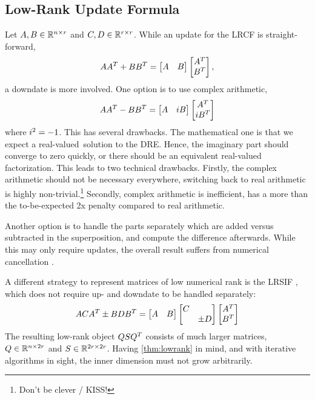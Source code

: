 \subsection{Low-Rank Update Formula}

Let $A, B \in\mathbb{R}^{n\times r}$ and $C, D\in\mathbb{R}^{r\times r}$.
While an update for the \ac{LRCF} is straight-forward,
\begin{equation}
  AA^T + BB^T =
  \begin{bmatrix}
    A & B
  \end{bmatrix}
  \begin{bmatrix}
    A^T \\ B^T
  \end{bmatrix}
  ,
\end{equation}
a downdate is more involved.
One option is to use complex arithmetic, \ie
\begin{equation}
  AA^T - BB^T =
  \begin{bmatrix}
    A & i B
  \end{bmatrix}
  \begin{bmatrix}
    A^T \\ i B^T
  \end{bmatrix}
\end{equation}
where $i^2=-1$.
This has several drawbacks.
The mathematical one is that we expect a real-valued\ solution to the \ac{DRE}.
Hence, the imaginary part should converge to zero quickly,
or there should be an equivalent real-valued factorization.
This leads to two technical drawbacks.
Firstly, the complex arithmetic should not be necessary everywhere,
switching back to real arithmetic is highly non-trivial.\footnote{Don't be clever / KISS!}
Secondly, complex arithmetic is inefficient, \ie has a more than the to-be-expected 2x penalty compared to real arithmetic.

Another option is to handle the parts separately which are added versus subtracted in the superposition,
and compute the difference afterwards.
While this may only require updates,
the overall result suffers from numerical cancellation
\cite[50]{Lang2015}
\cite[\pno~186, thesis~10]{Lang2017}.

A different strategy to represent matrices of low numerical rank is the \ac{LRSIF} \cite{Benner2009,Lang2015},
which does not require up- and downdate to be handled separately:
\begin{equation}
  ACA^T \pm BDB^T =
  \begin{bmatrix}
    A & B
  \end{bmatrix}
  \begin{bmatrix}
    C \\ & \pm D
  \end{bmatrix}
  \begin{bmatrix}
    A^T \\ B^T
  \end{bmatrix}
\end{equation}
The resulting low-rank object $QSQ^T$ consists of much larger matrices,
$Q \in\mathbb{R}^{n\times 2r}$ and $S\in\mathbb{R}^{2r\times 2r}$.
Having \autoref{thm:lowrank} in mind,
and with iterative algorithms in sight,
the inner dimension must not grow arbitrarily.

